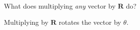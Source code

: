 What does multiplying \emph{any} vector by $\boldsymbol{R}$ do?

\begin{solution}
Multiplying by $\boldsymbol{R}$ rotates the vector by $\theta$.
\end{solution}